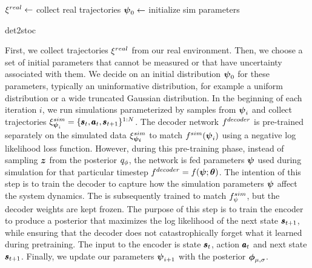 \vspace{\baselineskip}%
\begin{algorithm}[H]
  \DontPrintSemicolon
  $\xi^{real} \leftarrow$ collect real trajectories \; \label{det2stoc:step1}
  $\boldsymbol{\psi}_0 \leftarrow$ initialize sim parameters \;
  \caption{det2stoc}
  \label{alg:det2stoc}
\end{algorithm}
\vspace{\baselineskip}%
First, we collect trajectories $\xi^{real}$ from our real environment.
Then, we choose a set of initial parameters that cannot be measured or that have uncertainty associated with them. We decide on an initial distribution $\boldsymbol{\psi}_0$ for these parameters, typically an uninformative distribution, for example a uniform distribution or a wide truncated Gaussian distribution.
In the beginning of each iteration $i$, we run simulations parameterized by samples from $\boldsymbol{\psi}_i$ and collect trajectories $\xi^{sim}_{\boldsymbol{\psi}_i}=\{\pmb{s}_t, \pmb{a}_t, \pmb{s}_{t+1}\}^{1:N}$. The decoder network $f^{decoder}{}$ is pre-trained separately on the simulated data $\xi^{sim}_{\boldsymbol{\psi_i}}{}$ to match $f^{sim}(\boldsymbol{\psi}_i)$ using a negative log likelihood loss function. However, during this pre-training phase, instead of sampling $\boldsymbol{z}$ from the posterior $q_{\phi}$, the network is fed parameters $\boldsymbol{\psi}$ used during simulation for that particular timestep $f^{decoder} = f(\boldsymbol{\psi}; \boldsymbol{\theta})$. The intention of this step is to train the decoder to capture how the simulation parameters $\boldsymbol{\psi}$ affect the system dynamics.%
The \cvae{} is subsequently trained to match $f^{sim}_{\psi}{}$, but the decoder weights are kept frozen. The purpose of this step is to train the encoder to produce a posterior that maximizes the log likelihood of the next state $\pmb{s}_{t+1}$, while ensuring that the decoder does not catastrophically forget \parencite{French2006CatastrophicFI} what it learned during pretraining. The input to the encoder is state $\pmb{s}_t$, action $\pmb{a}_t$ and next state $\pmb{s}_{t+1}$. %
Finally, we update our parameters $\boldsymbol{\psi}_{i+1}$ with the posterior $\boldsymbol{\phi}_{\mu, \sigma}$.

